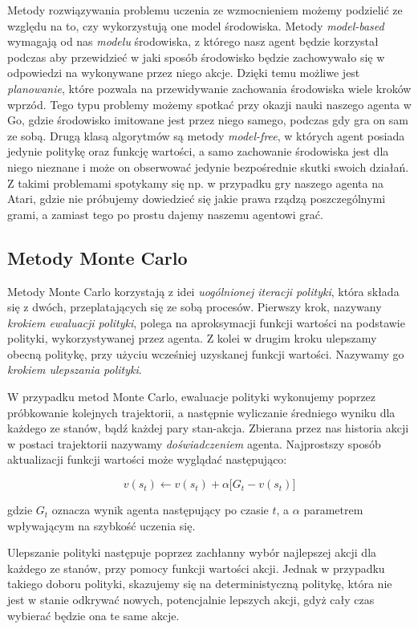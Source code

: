 \documentclass[licencjacka]{pracamgr}
\begin{document}
Metody rozwiązywania problemu uczenia ze wzmocnieniem możemy podzielić ze względu na to, czy wykorzystują one model środowiska. Metody \emph{model-based} wymagają od nas \emph{modelu} środowiska, z którego nasz agent będzie korzystał podczas aby przewidzieć w jaki sposób środowisko będzie zachowywało się w odpowiedzi na wykonywane przez niego akcje.
Dzięki temu możliwe jest \emph{planowanie}, które pozwala na przewidywanie zachowania środowiska wiele kroków wprzód. Tego typu problemy możemy spotkać przy okazji nauki naszego agenta w Go, gdzie środowisko imitowane jest przez niego samego, podczas gdy gra on sam ze sobą. 
Drugą klasą algorytmów są metody \emph{model-free}, w których agent posiada jedynie politykę oraz funkcję wartości, a samo zachowanie środowiska jest dla niego nieznane i może on obserwować jedynie bezpośrednie skutki swoich działań. Z takimi problemami spotykamy się np. w przypadku gry naszego agenta na Atari, gdzie nie próbujemy dowiedzieć się jakie prawa rządzą poszczególnymi grami, a zamiast tego po prostu dajemy naszemu agentowi grać.

\subsection{Metody Monte Carlo}

Metody Monte Carlo korzystają z idei \emph{uogólnionej iteracji polityki}, która składa się z dwóch, przeplatających się ze sobą procesów. Pierwszy krok, nazywany \emph{krokiem ewaluacji polityki}, polega na aproksymacji funkcji wartości na podstawie polityki, wykorzystywanej przez agenta. Z kolei w drugim kroku ulepszamy obecną politykę, przy użyciu wcześniej uzyskanej funkcji wartości. Nazywamy go \emph{krokiem ulepszania polityki}.

W przypadku metod Monte Carlo, ewaluacje polityki wykonujemy poprzez próbkowanie kolejnych trajektorii, a następnie wyliczanie średniego wyniku dla każdego ze stanów, bądź każdej pary stan-akcja. Zbierana przez nas historia akcji w postaci trajektorii nazywamy \emph{doświadczeniem} agenta. Najprostszy sposób aktualizacji funkcji wartości może wyglądać następująco:

$$ v(s_t) \leftarrow v(s_t) + \alpha \big[G_t - v(s_t)\big] $$

gdzie $G_t$ oznacza wynik agenta następujący po czasie $t$, a $\alpha$ parametrem wpływającym na szybkość uczenia się.

Ulepszanie polityki następuje poprzez zachłanny wybór najlepszej akcji dla każdego ze stanów, przy pomocy funkcji wartości akcji. Jednak w przypadku takiego doboru polityki, skazujemy się na deterministyczną politykę, która nie jest w stanie odkrywać nowych, potencjalnie lepszych akcji, gdyż cały czas wybierać będzie ona te same akcje. 
\end{document}
